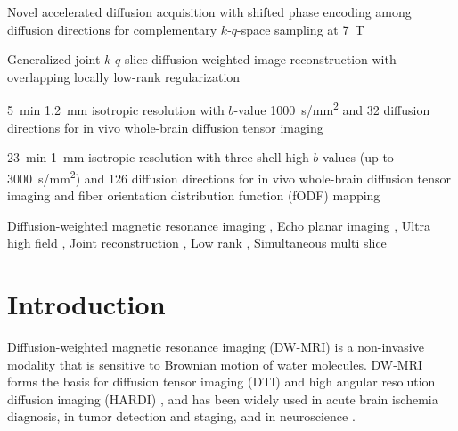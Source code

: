 \documentclass[preprint,12pt,authoryear,review]{elsarticle}
\begin{document}
\begin{frontmatter}
		\begin{highlights}
			\item Novel accelerated diffusion acquisition
			with shifted phase encoding among diffusion directions
			for complementary $k$-$q$-space sampling at \SI{7}{\tesla}

                \item Generalized joint $k$-$q$-slice
			diffusion-weighted image reconstruction
			with overlapping locally low-rank regularization

                \item \SI{5}{min} \SI{1.2}{mm} isotropic resolution
			with $b$-value \SI{1000}{s/mm^2} and 32 diffusion directions
			for in vivo whole-brain diffusion tensor imaging

			\item \SI{23}{min} \SI{1}{mm} isotropic resolution
			with three-shell high $b$-values (up to \SI{3000}{s/mm^2})
                and 126 diffusion directions
			for in vivo whole-brain diffusion tensor imaging
                and fiber orientation distribution function (fODF) mapping
		\end{highlights}

		\begin{keyword}
			Diffusion-weighted magnetic resonance imaging \sep
			Echo planar imaging \sep
			Ultra high field \sep
			Joint reconstruction \sep
			Low rank \sep
			Simultaneous multi slice


		\end{keyword}

	\end{frontmatter}

	\pagebreak
	\linenumbers

	\section{Introduction}
	\label{SEC:Intr}

	Diffusion-weighted magnetic resonance imaging (DW-MRI)
        \citep{lebihan_1986_diff,merboldt_1985_diff} is a non-invasive modality
	that is sensitive to Brownian motion of water molecules.
	DW-MRI forms the basis for diffusion tensor imaging (DTI) \citep{basser_1994_dmri,mori_2001_track}
	and high angular resolution diffusion imaging (HARDI) \citep{tuch_2002_hardi},
	and has been widely used in acute brain ischemia diagnosis, in tumor detection and staging,
	and in neuroscience \citep{jones_2010_diff}.
\end{document}
